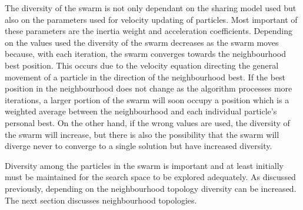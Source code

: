 The diversity of the swarm is not only dependant on the sharing model used but also on the parameters used for velocity updating of particles. Most important of these parameters are the inertia weight and acceleration coefficients. Depending on the values used the diversity of the swarm decreases as the swarm moves because, with each iteration, the swarm converges towards the neighbourhood best position\cite{PSOHybridJobShop,CompuIntelligenceIntro,FundamentalSwarm}. This occurs due to the velocity equation directing the general movement of a particle in the direction of the neighbourhood best\cite{PSOHybridJobShop,CompuIntelligenceIntro,FundamentalSwarm}. If the best position in the neighbourhood does not change as the algorithm processes more iterations, a larger portion of the swarm will soon occupy a position which is a weighted average between the neighbourhood and each individual particle's personal best\cite{PSOHybridJobShop,CompuIntelligenceIntro,FundamentalSwarm}. On the other hand, if the wrong values are used, the diversity of the swarm will increase, but there is also the possibility that the swarm will diverge never to converge to a single solution but have increased diversity\cite{FundamentalSwarm}.

Diversity among the particles in the swarm is important and at least initially must be maintained for the search space to be explored adequately. As discussed previously, depending on the neighbourhood topology diversity can be increased. The next section discusses neighbourhood topologies.
